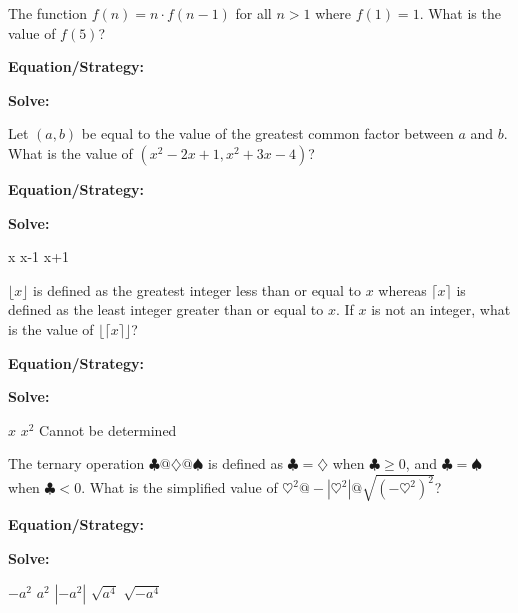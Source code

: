 \vfill
\newpage
\begin{multicols*}{2}
\begin{outline}[enumerate]
\medium

\1 The function $f(n)=n\cdot f(n-1)$ for all $n>1$ where $f(1)=1$. What is the value of $f(5)$?

\bigskip
\textbf{Equation/Strategy:} \hrulefill

\bigskip
\textbf{Solve:}

\vfill
{}

\midline

\1 Let $(a,b)$ be equal to the value of the greatest common factor between $a$ and $b$. What is the value of $(x^2-2x+1, x^2+3x-4)$?

\bigskip
\textbf{Equation/Strategy:} \hrulefill

\bigskip
\textbf{Solve:}

\vfill
{}
\2 x
\2 x-1
\2 x+1

\columnbreak
\advanced

\1 $\lfloor x\rfloor$ is defined as the greatest integer less than or equal to $x$ whereas $\lceil x\rceil$ is defined as the least integer greater than or equal to $x$. If $x$ is not an integer, what is the value of $\lfloor\lceil x\rceil\rfloor$?

\bigskip
\textbf{Equation/Strategy:} \hrulefill

\bigskip
\textbf{Solve:}

\vfill
{}
\2 $x$
\2 $x^2$
\2 Cannot be determined

\midline

\1 The ternary operation $\clubsuit@\diamondsuit@\spadesuit$ is defined as $\clubsuit=\diamondsuit$ when $\clubsuit\geq0$, and $\clubsuit=\spadesuit$ when $\clubsuit<0$. What is the simplified value of $\heartsuit^2@-\left|\heartsuit^2\right|@\sqrt{(-\heartsuit^2)^2}$?

\bigskip
\textbf{Equation/Strategy:} \hrulefill

\bigskip
\textbf{Solve:}

\vfill
\2 $-a^2$
\2 $a^2$
\2 $\left|-a^2\right|$
\2 $\sqrt{a^4}$
\2 $\sqrt{-a^4}$
\end{outline}
\end{multicols*}
